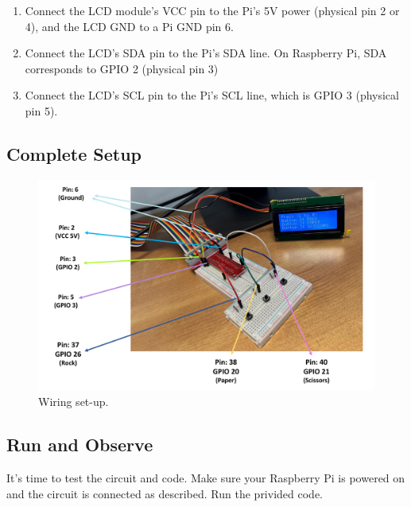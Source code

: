 \documentclass[a4paper,11pt]{article}
\begin{document}
\begin{enumerate}
    \item Connect the LCD module's VCC pin to the Pi's 5V power (physical pin 2 or 4), 
    and the LCD GND to a Pi GND pin 6.

    \item Connect the LCD’s SDA pin to the Pi’s SDA line. On Raspberry Pi, SDA corresponds to GPIO 2 (physical pin 3)

    \item Connect the LCD's SCL pin to the Pi's SCL line, which is GPIO 3 (physical pin 5).

\end{enumerate}


\subsection*{Complete Setup}
\begin{figure}[h] %
    \centering
    \includegraphics[width=.85\textwidth]{fig2.pdf} %
    \caption{Wiring set-up.}
    \label{fig:runtime1}
\end{figure}
\newpage
\subsection*{Run and Observe}
It’s time to test the circuit and code. Make sure your 
Raspberry Pi is powered on and the circuit is connected as described. 
Run the privided code.
\end{document}
